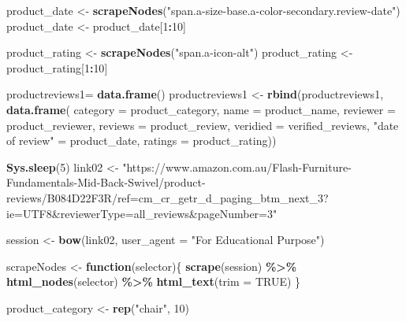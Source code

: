 \documentclass[
]{article}
\newenvironment{Shaded}{\begin{snugshade}}{\end{snugshade}}
\newcommand{\AttributeTok}[1]{\textcolor[rgb]{0.13,0.29,0.53}{#1}}
\newcommand{\ConstantTok}[1]{\textcolor[rgb]{0.56,0.35,0.01}{#1}}
\newcommand{\ControlFlowTok}[1]{\textcolor[rgb]{0.13,0.29,0.53}{\textbf{#1}}}
\newcommand{\DecValTok}[1]{\textcolor[rgb]{0.00,0.00,0.81}{#1}}
\newcommand{\FunctionTok}[1]{\textcolor[rgb]{0.13,0.29,0.53}{\textbf{#1}}}
\newcommand{\NormalTok}[1]{#1}
\newcommand{\OtherTok}[1]{\textcolor[rgb]{0.56,0.35,0.01}{#1}}
\newcommand{\SpecialCharTok}[1]{\textcolor[rgb]{0.81,0.36,0.00}{\textbf{#1}}}
\newcommand{\StringTok}[1]{\textcolor[rgb]{0.31,0.60,0.02}{#1}}
\begin{document}
\begin{Shaded}
\begin{Highlighting}[]
\NormalTok{  product\_date }\OtherTok{\textless{}{-}} \FunctionTok{scrapeNodes}\NormalTok{(}\StringTok{"span.a{-}size{-}base.a{-}color{-}secondary.review{-}date"}\NormalTok{)}
\NormalTok{  product\_date }\OtherTok{\textless{}{-}}\NormalTok{ product\_date[}\DecValTok{1}\SpecialCharTok{:}\DecValTok{10}\NormalTok{]}
  
\NormalTok{  product\_rating }\OtherTok{\textless{}{-}} \FunctionTok{scrapeNodes}\NormalTok{(}\StringTok{"span.a{-}icon{-}alt"}\NormalTok{)}
\NormalTok{  product\_rating }\OtherTok{\textless{}{-}}\NormalTok{ product\_rating[}\DecValTok{1}\SpecialCharTok{:}\DecValTok{10}\NormalTok{]}
  
\NormalTok{  productreviews1}\OtherTok{=} \FunctionTok{data.frame}\NormalTok{()}
\NormalTok{  productreviews1 }\OtherTok{\textless{}{-}} \FunctionTok{rbind}\NormalTok{(productreviews1, }\FunctionTok{data.frame}\NormalTok{(}
                      \AttributeTok{category =}\NormalTok{ product\_category,}
                      \AttributeTok{name =}\NormalTok{ product\_name,}
                      \AttributeTok{reviewer =}\NormalTok{ product\_reviewer,}
                      \AttributeTok{reviews =}\NormalTok{ product\_review,}
                      \AttributeTok{veridied =}\NormalTok{ verified\_reviews,}
                      \StringTok{"date of review"} \OtherTok{=}\NormalTok{ product\_date,}
                      \AttributeTok{ratings =}\NormalTok{ product\_rating))}

  
\FunctionTok{Sys.sleep}\NormalTok{(}\DecValTok{5}\NormalTok{)}
\NormalTok{link02 }\OtherTok{\textless{}{-}} \StringTok{"https://www.amazon.com.au/Flash{-}Furniture{-}Fundamentals{-}Mid{-}Back{-}Swivel/product{-}reviews/B084D22F3R/ref=cm\_cr\_getr\_d\_paging\_btm\_next\_3?ie=UTF8\&reviewerType=all\_reviews\&pageNumber=3"}


\NormalTok{  session }\OtherTok{\textless{}{-}} \FunctionTok{bow}\NormalTok{(link02,}
               \AttributeTok{user\_agent =} \StringTok{"For Educational Purpose"}\NormalTok{)}

\NormalTok{  scrapeNodes }\OtherTok{\textless{}{-}} \ControlFlowTok{function}\NormalTok{(selector)\{}
    \FunctionTok{scrape}\NormalTok{(session) }\SpecialCharTok{\%\textgreater{}\%}
      \FunctionTok{html\_nodes}\NormalTok{(selector) }\SpecialCharTok{\%\textgreater{}\%}
      \FunctionTok{html\_text}\NormalTok{(}\AttributeTok{trim =} \ConstantTok{TRUE}\NormalTok{)}
\NormalTok{  \}}

\NormalTok{  product\_category }\OtherTok{\textless{}{-}} \FunctionTok{rep}\NormalTok{(}\StringTok{"chair"}\NormalTok{, }\DecValTok{10}\NormalTok{)}


\end{Highlighting}
\end{Shaded}
\end{document}
